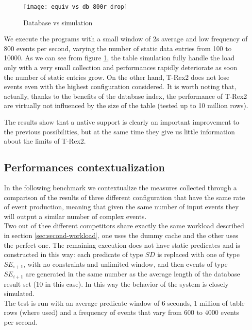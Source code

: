 \begin{figure}[h]
  \centering
  \texttt{[image: equiv\_vs\_db\_800r\_drop]}
  \caption{Database vs simulation}
  \label{fig:equiv_vs_db_800r_drop}
\end{figure}

We execute the programs with a small window of 2s average and low frequency of 800 events per second, varying the number of static data entries from 100 to 10000. As we can see from figure \ref{fig:equiv_vs_db_800r_drop}, the table simulation fully handle the load only with a very small collection and performances rapidly deteriorate as soon the number of static entries grow. On the other hand, T-Rex2 does not lose events even with the highest configuration considered. It is worth noting that, actually, thanks to the benefits of the database index, the performance of T-Rex2 are virtually not influenced by the size of the table (tested up to 10 million rows).

The results show that a native support is clearly an important improvement to the previous possibilities, but at the same time they give us little information about the limits of T-Rex2.

\subsection{Performances contextualization}
In the following benchmark we contextualize the measures collected through a comparison of the results of three different configuration that have the same rate of event production, meaning that given the same number of input events they will output a similar number of complex events.\\
Two out of thee different competitors share exactly the same workload described in section \ref{sec:second-workload}, one uses the dummy cache and the other uses the perfect one. The remaining execution does not have static predicates and is constructed in this way: each predicate of type $SD$ is replaced with one of type $SE_{i+1}$, with no constraints and unlimited window, and then events of type $SE_{i+1}$ are generated in the same number as the average length of the database result set (10 in this case). In this way the behavior of the system is closely simulated.\\
The test is run with an average predicate window of 6 seconds, 1 million of table rows (where used) and a frequency of events that vary from 600 to 4000 events per second.

